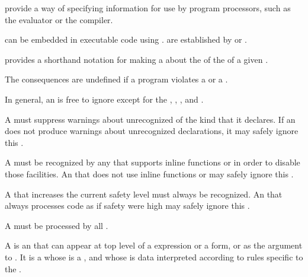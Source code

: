 
 provide a way of specifying information for use by
program processors, such as the evaluator or the compiler.

 can be embedded in executable code using .
 are established by  or .

 provides a shorthand notation for 
making a  about the  of the
 of a given .

The consequences are undefined if a program violates a 
or a .


In general, an  is free to ignore
 except for the
     ,
     ,
     ,
 and  .

A   must suppress warnings
about unrecognized  of the kind that it declares.
If an  does not produce warnings about
unrecognized declarations, it may safely ignore this .

A   must be recognized by any 
that supports inline functions or  in order to disable those facilities.
An  that does not use inline functions or 
may safely ignore this .

A   that increases the current safety level 
must always be recognized.  An  that always processes 
code as if safety were high may safely ignore this .

A   must be processed by all .

\endSubsection%


A  is an  that can appear at
top level of a  expression or a  form, or as 
the argument to .
It is a  whose  is a ,
and whose  is data interpreted according to rules specific to
the .

